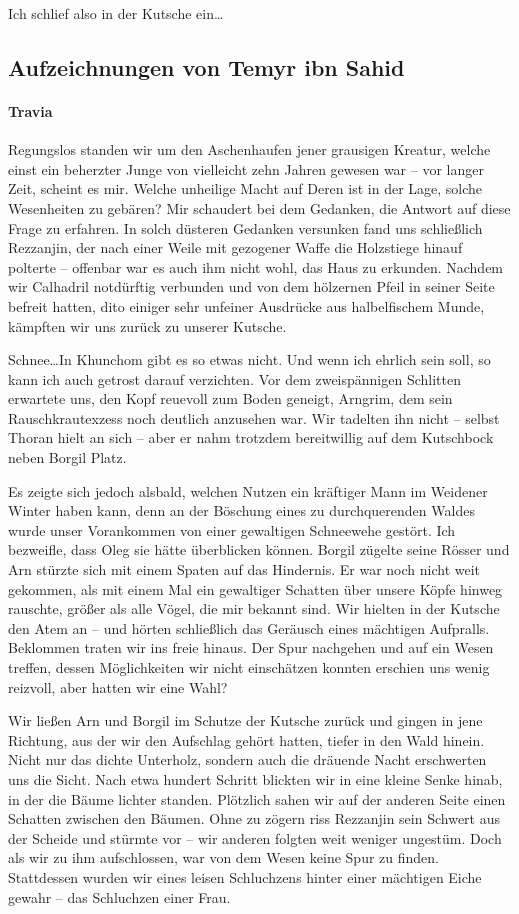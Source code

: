 Ich schlief also in der Kutsche ein\dots 

\subsection{Aufzeichnungen von Temyr ibn Sahid}

\paragraph{Travia}
Regungslos standen wir um den Aschenhaufen jener grausigen Kreatur, welche einst ein beherzter Junge von vielleicht zehn Jahren gewesen war -- vor langer Zeit, scheint es mir. Welche unheilige Macht auf Deren ist in der Lage, solche Wesenheiten zu gebären? Mir schaudert bei dem Gedanken, die Antwort auf diese Frage zu erfahren. In solch düsteren Gedanken versunken fand uns schließlich Rezzanjin, der nach einer Weile mit gezogener Waffe die Holzstiege hinauf polterte -- offenbar war es auch ihm nicht wohl, das Haus zu erkunden. Nachdem wir Calhadril notdürftig verbunden und von dem hölzernen Pfeil in seiner Seite befreit hatten, dito einiger sehr unfeiner Ausdrücke aus halbelfischem Munde, kämpften wir uns zurück zu unserer Kutsche. 


Schnee\dots In Khunchom gibt es so etwas nicht. Und wenn ich ehrlich sein soll, so kann ich auch getrost darauf verzichten. Vor dem zweispännigen Schlitten erwartete uns, den Kopf reuevoll zum Boden geneigt, Arngrim, dem sein Rauschkrautexzess noch deutlich anzusehen war. Wir tadelten ihn nicht -- selbst Thoran hielt an sich -- aber er nahm trotzdem bereitwillig auf dem Kutschbock neben Borgil Platz. 


Es zeigte sich jedoch alsbald, welchen Nutzen ein kräftiger Mann im Weidener Winter haben kann, denn an der Böschung eines zu durchquerenden Waldes wurde unser Vorankommen von einer gewaltigen Schneewehe gestört. Ich bezweifle, dass Oleg sie hätte überblicken können. Borgil zügelte seine Rösser und Arn stürzte sich mit einem Spaten auf das Hindernis. Er war noch nicht weit gekommen, als mit einem Mal ein gewaltiger Schatten über unsere Köpfe hinweg rauschte, größer als alle Vögel, die mir bekannt sind. Wir hielten in der Kutsche den Atem an -- und hörten schließlich das Geräusch eines mächtigen Aufpralls. Beklommen traten wir ins freie hinaus. Der Spur nachgehen und auf ein Wesen treffen, dessen Möglichkeiten wir nicht einschätzen konnten erschien uns wenig reizvoll, aber hatten wir eine Wahl?


Wir ließen Arn und Borgil im Schutze der Kutsche zurück und gingen in jene Richtung, aus der wir den Aufschlag gehört hatten, tiefer in den Wald hinein. Nicht nur das dichte Unterholz, sondern auch die dräuende Nacht erschwerten uns die Sicht. Nach etwa hundert Schritt blickten wir in eine kleine Senke hinab, in der die Bäume lichter standen. Plötzlich sahen wir auf der anderen Seite einen Schatten zwischen den Bäumen. Ohne zu zögern riss Rezzanjin sein Schwert aus der Scheide und stürmte vor -- wir anderen folgten weit weniger ungestüm. Doch als wir zu ihm aufschlossen, war von dem Wesen keine Spur zu finden. Stattdessen wurden wir eines leisen Schluchzens hinter einer mächtigen Eiche gewahr -- das Schluchzen einer Frau.

